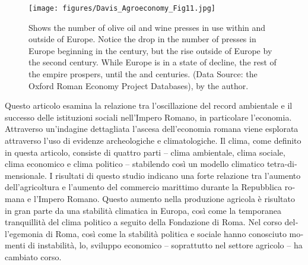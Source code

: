 	\begin{figure}[!p]
		\texttt{[image: figures/Davis\_Agroeconomy\_Fig11.jpg]}
		\centering
		\caption{Shows the number of olive oil and wine presses in use within and outside of Europe. Notice the drop in the number of presses in Europe beginning in the  century, but the rise outside of Europe by the second century. While Europe is in a state of decline, the rest of the empire prospers, until the  and  centuries. (Data Source: the Oxford Roman Economy Project Databases), by the author.}
		\label{fig:DavisFig11}
	\end{figure}
\clearpage	
\myseparator
\begin{myabstract}	
	\foreignlanguage{italian}{Questo articolo esamina la relazione tra l'oscillazione del record ambientale e il successo delle istituzioni sociali nell'Impero Romano, in particolare l'economia. Attraverso un'indagine dettagliata l'ascesa dell'economia romana viene esplorata  attraverso l'uso di evidenze archeologiche e climatologiche. Il clima, come definito in questa articolo, consiste di quattro parti – clima ambientale, clima sociale, clima economico e clima politico – stabilendo così un modello climatico tetra-dimensionale. I risultati di questo studio indicano una forte relazione tra l'aumento dell'agricoltura e l'aumento del commercio marittimo durante la Repubblica romana e l'Impero Romano. Questo aumento nella produzione agricola è risultato in gran parte da una stabilità climatica in Europa, così come la temporanea tranquillità del clima politico a seguito della Fondazione di Roma. Nel corso dell'egemonia di Roma, così come la stabilità politica e sociale hanno conosciuto momenti di instabilità, lo, sviluppo economico – soprattutto nel settore agricolo – ha cambiato corso.}

	

\end{myabstract}
